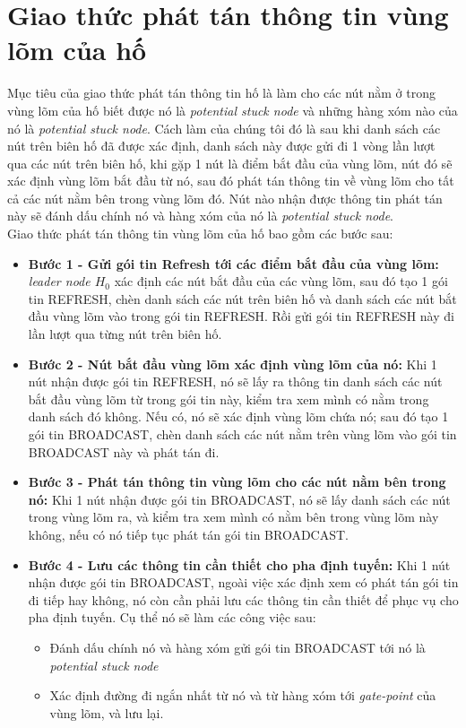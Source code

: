 \documentclass[12pt]{report}
\begin{document}
\section{Giao thức phát tán thông tin vùng lõm của hố}
\label{sec:4.4}
Mục tiêu của giao thức phát tán thông tin hố là làm cho các nút nằm ở trong vùng lõm của hố biết được nó là \textit{potential stuck node} và những hàng xóm nào của nó là \textit{potential stuck node}. Cách làm của chúng tôi đó là sau khi danh sách các nút trên biên hố đã được xác định, danh sách này được gửi đi 1 vòng lần lượt qua các nút trên biên hố, khi gặp 1 nút là điểm bắt đầu của vùng lõm, nút đó sẽ xác định vùng lõm bắt đầu từ nó, sau đó phát tán thông tin về vùng lõm cho tất cả các nút nằm bên trong vùng lõm đó. Nút nào nhận được thông tin phát tán này sẽ đánh dấu chính nó và hàng xóm của nó là \textit{potential stuck node}.\\ 
Giao thức phát tán thông tin vùng lõm của hố bao gồm các bước sau:
\begin{itemize}
\item \textbf{Bước 1 - Gửi gói tin Refresh tới các điểm bắt đầu của vùng lõm:} \textit{leader node $ H_{0}$} xác định các nút bắt đầu của các vùng lõm, sau đó tạo 1 gói tin REFRESH, chèn danh sách các nút trên biên hố và danh sách các nút bắt đầu vùng lõm vào trong gói tin REFRESH. Rồi gửi gói tin REFRESH này đi lần lượt qua từng nút trên biên hố. 
\item \textbf{Bước 2 - Nút bắt đầu vùng lõm xác định vùng lõm của nó:} Khi 1 nút nhận được gói tin REFRESH, nó sẽ lấy ra thông tin danh sách các nút bắt đầu vùng lõm từ trong gói tin này, kiểm tra xem mình có nằm trong danh sách đó không. Nếu có, nó sẽ xác định vùng lõm chứa nó; sau đó tạo 1 gói tin BROADCAST, chèn danh sách các nút nằm trên vùng lõm vào gói tin BROADCAST này và phát tán đi.
\item \textbf{Bước 3 - Phát tán thông tin vùng lõm cho các nút nằm bên trong nó:} Khi 1 nút nhận được gói tin BROADCAST, nó sẽ lấy danh sách các nút trong vùng lõm ra, và kiểm tra xem mình có nằm bên trong vùng lõm này không, nếu có nó tiếp tục phát tán gói tin BROADCAST.
\item \textbf{Bước 4 - Lưu các thông tin cần thiết cho pha định tuyến:} Khi 1 nút nhận được gói tin BROADCAST, ngoài việc xác định xem có phát tán gói tin đi tiếp hay không, nó còn cần phải lưu các thông tin cần thiết để phục vụ cho pha định tuyến. Cụ thể nó sẽ làm các công việc sau:
\begin{itemize}
\item Đánh dấu chính nó và hàng xóm gửi gói tin BROADCAST tới nó là \textit{potential stuck node}
\item Xác định đường đi ngắn nhất từ nó và từ hàng xóm tới \textit{gate-point} của vùng lõm, và lưu lại.
\end{itemize}
\end{itemize}
\end{document}
